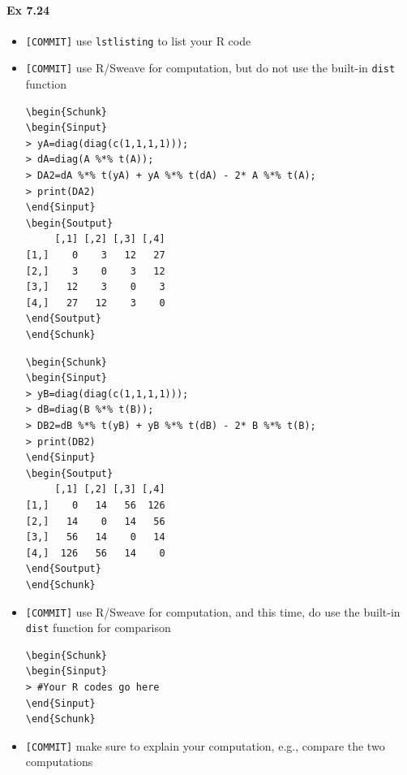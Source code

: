 \documentclass[12pt]{article}
\begin{document}
\paragraph{Ex 7.24}
\begin{itemize}
    \item \verb+[COMMIT]+ use \verb+lstlisting+ to list your R code
    \item \verb+[COMMIT]+ use R/Sweave for computation, but do not use the built-in \verb+dist+
        function
\begin{lstlisting}
\begin{Schunk}
\begin{Sinput}
> yA=diag(diag(c(1,1,1,1)));
> dA=diag(A %*% t(A));
> DA2=dA %*% t(yA) + yA %*% t(dA) - 2* A %*% t(A);
> print(DA2)
\end{Sinput}
\begin{Soutput}
     [,1] [,2] [,3] [,4]
[1,]    0    3   12   27
[2,]    3    0    3   12
[3,]   12    3    0    3
[4,]   27   12    3    0
\end{Soutput}
\end{Schunk}
\end{lstlisting}
\begin{lstlisting}
\begin{Schunk}
\begin{Sinput}
> yB=diag(diag(c(1,1,1,1)));
> dB=diag(B %*% t(B));
> DB2=dB %*% t(yB) + yB %*% t(dB) - 2* B %*% t(B);
> print(DB2)
\end{Sinput}
\begin{Soutput}
     [,1] [,2] [,3] [,4]
[1,]    0   14   56  126
[2,]   14    0   14   56
[3,]   56   14    0   14
[4,]  126   56   14    0
\end{Soutput}
\end{Schunk}
\end{lstlisting}
    \item \verb+[COMMIT]+ use R/Sweave for computation, and this time, do use the built-in \verb+dist+
        function for comparison
\begin{lstlisting}
\begin{Schunk}
\begin{Sinput}
> #Your R codes go here
\end{Sinput}
\end{Schunk}
\end{lstlisting}
    \item \verb+[COMMIT]+ make sure to explain your computation, e.g., compare the two
        computations
\end{itemize}
\end{document}
